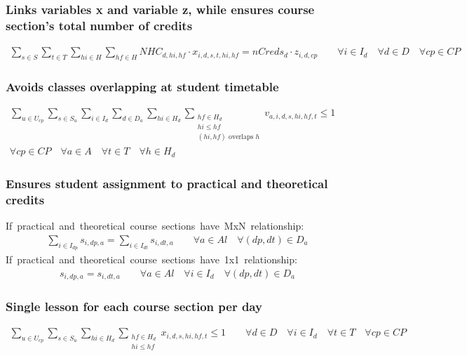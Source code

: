 \subsubsection{Links variables x and variable z, while ensures course section's total number of credits}
\begin{eqnarray}
\sum\limits_{s \in S}\sum\limits_{t \in T}\sum\limits_{hi \in H}\sum\limits_{hf \in H} NHC_{d,hi,hf} \cdot x_{i,d,s,t,hi,hf} = nCreds_{d} \cdot z_{i,d,cp} \nonumber \qquad
\forall i \in I_{d} \quad
\forall d \in D \quad
\forall cp \in CP
\end{eqnarray}

\subsubsection{Avoids classes overlapping at student timetable}
\begin{eqnarray}
\sum\limits_{u \in U_{cp}} \sum\limits_{s \in S_{u}} \sum\limits_{i \in I_{d}} \sum\limits_{d \in D_{a}} \sum\limits_{hi \in H_{d}} \sum_{\substack {hf \in H_{d} \\ hi\le hf \\ (hi,hf)\mbox{ overlaps }h}} v_{a,i,d,s,hi,hf,t}  \leq  1  \nonumber \qquad 
\\
\forall cp \in CP \quad
\forall a \in A \quad
\forall t \in T \quad
\forall h \in H_{d}
\end{eqnarray}

\subsubsection{Ensures student assignment to practical and theoretical credits}
\mbox{If practical and theoretical course sections have MxN relationship:}
\begin{eqnarray}
\sum\limits_{i \in I_{dp}} s_{i,dp,a} = \sum\limits_{ i \in I_{dt} } s_{i,dt,a} \nonumber \qquad 
\forall a \in Al \quad
\forall (dp,dt) \in D_{a} \quad
\end{eqnarray}
\mbox{If practical and theoretical course sections have 1x1 relationship:}
\begin{eqnarray}
s_{i,dp,a} = s_{i,dt,a} \nonumber \qquad 
\forall a \in Al \quad
\forall i \in I_{d} \quad
\forall (dp,dt) \in D_{a} \quad
\end{eqnarray}

\subsubsection{Single lesson for each course section per day}
\begin{eqnarray}
\sum\limits_{u \in U_{cp}} \sum\limits_{s \in S_{u}} \sum\limits_{hi \in H_{d}} \sum_{\substack {hf \in H_{d} \\ hi\le hf}} x_{i,d,s,hi,hf,t}  \leq  1  \nonumber \qquad 
\forall d \in D \quad
\forall i \in I_{d} \quad
\forall t \in T \quad
\forall cp \in CP 
\end{eqnarray}


